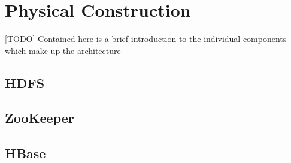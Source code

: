 
\chapter{Physical Construction}
[TODO] Contained here is a brief introduction to the individual components which make up the architecture
\section{HDFS}

\section{ZooKeeper}

\section{HBase}

